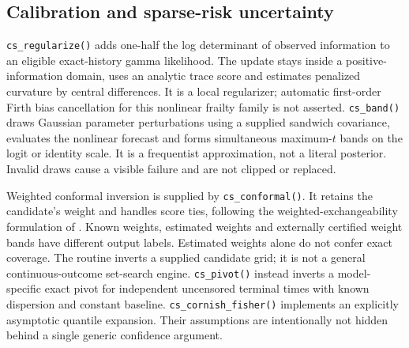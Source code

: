 \documentclass[article,nojss]{jss}
\newcommand{\code}[1]{\texttt{#1}}
\begin{document}
\subsection{Calibration and sparse-risk uncertainty}
\code{cs\_regularize()} adds one-half the log determinant of observed information to an eligible exact-history gamma likelihood. The update stays inside a positive-information domain, uses an analytic trace score and estimates penalized curvature by central differences. It is a local regularizer; automatic first-order Firth bias cancellation for this nonlinear frailty family is not asserted. \code{cs\_band()} draws Gaussian parameter perturbations using a supplied sandwich covariance, evaluates the nonlinear forecast and forms simultaneous maximum-$t$ bands on the logit or identity scale. It is a frequentist approximation, not a literal posterior. Invalid draws cause a visible failure and are not clipped or replaced.

Weighted conformal inversion is supplied by \code{cs\_conformal()}. It retains the candidate's weight and handles score ties, following the weighted-exchangeability formulation of \citet{Tibshirani2019}. Known weights, estimated weights and externally certified weight bands have different output labels. Estimated weights alone do not confer exact coverage. The routine inverts a supplied candidate grid; it is not a general continuous-outcome set-search engine. \code{cs\_pivot()} instead inverts a model-specific exact pivot for independent uncensored terminal times with known dispersion and constant baseline. \code{cs\_cornish\_fisher()} implements an explicitly asymptotic quantile expansion. Their assumptions are intentionally not hidden behind a single generic confidence argument.
\end{document}
